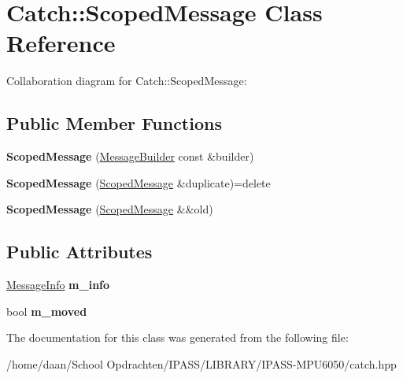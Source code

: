 \hypertarget{classCatch_1_1ScopedMessage}{}\section{Catch\+:\+:Scoped\+Message Class Reference}
\label{classCatch_1_1ScopedMessage}


Collaboration diagram for Catch\+:\+:Scoped\+Message\+:
\subsection*{Public Member Functions}
\begin{DoxyCompactItemize}
\item 
\mbox{\label{classCatch_1_1ScopedMessage_a5cc59f0f2ebe840e6607f83004d49a17}} 
{\bfseries Scoped\+Message} (\hyperlink{structCatch_1_1MessageBuilder}{Message\+Builder} const \&builder)
\item 
\mbox{\label{classCatch_1_1ScopedMessage_a5fe2e79afdfd737818c15edfc49f378e}} 
{\bfseries Scoped\+Message} (\hyperlink{classCatch_1_1ScopedMessage}{Scoped\+Message} \&duplicate)=delete
\item 
\mbox{\label{classCatch_1_1ScopedMessage_aac833a6a2245a26e6bd5c9252ca1caa0}} 
{\bfseries Scoped\+Message} (\hyperlink{classCatch_1_1ScopedMessage}{Scoped\+Message} \&\&old)
\end{DoxyCompactItemize}
\subsection*{Public Attributes}
\begin{DoxyCompactItemize}
\item 
\mbox{\label{classCatch_1_1ScopedMessage_ae6e1476f389cc6e1586f033b3747b27b}} 
\hyperlink{structCatch_1_1MessageInfo}{Message\+Info} {\bfseries m\+\_\+info}
\item 
\mbox{\label{classCatch_1_1ScopedMessage_a4fe5607c1f7407240a0da8405b1c12e7}} 
bool {\bfseries m\+\_\+moved}
\end{DoxyCompactItemize}


The documentation for this class was generated from the following file\+:\begin{DoxyCompactItemize}
\item 
/home/daan/\+School Opdrachten/\+I\+P\+A\+S\+S/\+L\+I\+B\+R\+A\+R\+Y/\+I\+P\+A\+S\+S-\/\+M\+P\+U6050/catch.\+hpp\end{DoxyCompactItemize}
